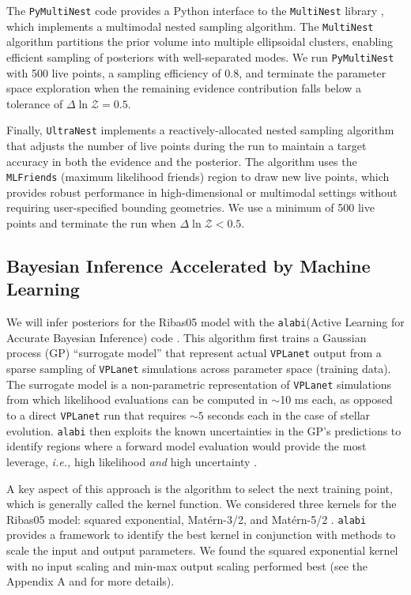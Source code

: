 \documentclass[preprint]{aastex631}
\def\ie{{\it i.e., }}
\def\vplanet{\texttt{\footnotesize{VPLanet}}\xspace}
\def\alabi{\texttt{\footnotesize{alabi}}\xspace}
\begin{document}
The \texttt{PyMultiNest} code \citep{Buchner14} provides a Python interface to
the \texttt{MultiNest} library \citep{Feroz09,Feroz19}, which
implements a multimodal nested sampling algorithm. The \texttt{MultiNest} algorithm
partitions the prior volume into multiple ellipsoidal clusters,
enabling efficient sampling of posteriors with well-separated modes.
We run \texttt{PyMultiNest} with 500 live points, a sampling efficiency of 0.8, and
terminate the parameter space exploration when the remaining evidence contribution falls below a
tolerance of $\Delta\ln\mathcal{Z} = 0.5$.

Finally, \texttt{UltraNest} \citep{Buchner21} implements a
reactively-allocated nested sampling algorithm that adjusts the number
of live points during the run to maintain a target accuracy in both
the evidence and the posterior. The algorithm uses the \texttt{MLFriends} (maximum likelihood friends)
region \citep{Buchner19} to draw new live points, which provides
robust performance in high-dimensional or multimodal settings without
requiring user-specified bounding geometries. We use a minimum of
500 live points and terminate the run when $\Delta\ln\mathcal{Z} < 0.5$.


\subsection{Bayesian Inference Accelerated by Machine Learning \label{sec:alabi}}

We will infer posteriors for the Ribas05 model with the \alabi (Active Learning for Accurate Bayesian Inference) code \citep{BirkyBarnes25}. This algorithm first trains a Gaussian process (GP) ``surrogate model'' that represent actual \vplanet output from a sparse sampling of \vplanet simulations across parameter space (training data). The surrogate model is a non-parametric representation of \vplanet simulations from which likelihood evaluations can be computed in $\sim$10 ms each, as opposed to a direct \vplanet run that requires $\sim5$ seconds each in the case of stellar evolution. \alabi then exploits the known uncertainties in the GP's predictions to identify regions where a forward model evaluation would provide the most leverage, \ie high likelihood {\it and} high uncertainty \citep{Kandasamy15,WangLi18,Fleming20}. 

A key aspect of this approach is the algorithm to select the next training point, which is generally called the kernel function. We considered three kernels for the Ribas05 model: squared exponential, Mat{\' e}rn-3/2, and Mat{\' e}rn-5/2 \citep{Matern86,Rasmussen06}. \alabi provides a framework to identify the best kernel in conjunction with methods to scale the input and output parameters. We found the squared exponential kernel with no input scaling and min-max output scaling performed best (see the Appendix A and \citet{BirkyBarnes25} for more details). 
\end{document}
